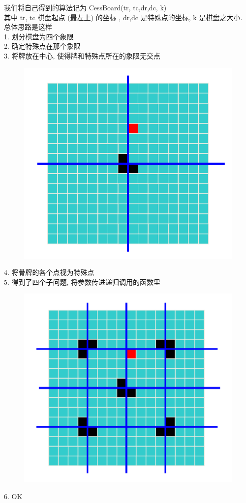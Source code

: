 \documentclass[a4paper, 10pt]{ctexart} %
\begin{document}
我们将自己得到的算法记为 {\sffamily CessBoard(tr, tc,dr,dc, k)}\\
其中 {\sffamily tr, tc} 棋盘起点 (最左上) 的坐标 , {\sffamily dr,dc} 是特殊点的坐标,
{\sffamily k} 是棋盘之大小. \\
总体思路是这样\\
1. 划分棋盘为四个象限\\
2. 确定特殊点在那个象限\\
3. 将牌放在中心, 使得牌和特殊点所在的象限无交点\\
\begin{figure}[H]
    \centering
    \includegraphics[scale = 0.3]{7.png}\caption{}
\end{figure}
4. 将骨牌的各个点视为特殊点\\
5. 得到了四个子问题, 将参数传进递归调用的函数里\\
\begin{figure}[H]
    \centering
    \includegraphics*[scale = 0.3]{8.png}\caption{}
\end{figure}
6. OK
\end{document}
